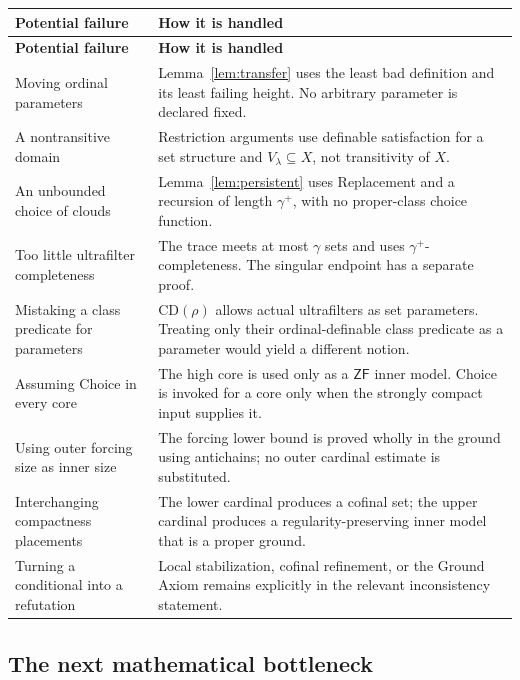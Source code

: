 \documentclass[11pt,letterpaper]{article}
\theoremstyle{definition}
\newcommand{\ZF}{\mathsf{ZF}}
\newcommand{\CD}{\mathrm{CD}}
\begin{document}
\begingroup\small
\renewcommand{\arraystretch}{1.16}
\begin{longtable}{@{}P{.30\textwidth}P{.64\textwidth}@{}}
\toprule
\textbf{Potential failure} & \textbf{How it is handled}\\
\midrule\endfirsthead
\toprule\textbf{Potential failure}&\textbf{How it is handled}\\\midrule\endhead
Moving ordinal parameters & Lemma~\ref{lem:transfer} uses the least bad definition and its least failing height. No arbitrary parameter is declared fixed.\\[4pt]
A nontransitive domain & Restriction arguments use definable satisfaction for a set structure and $V_\lambda\subseteq X$, not transitivity of $X$.\\[4pt]
An unbounded choice of clouds & Lemma~\ref{lem:persistent} uses Replacement and a recursion of length $\gamma^+$, with no proper-class choice function.\\[4pt]
Too little ultrafilter completeness & The trace meets at most $\gamma$ sets and uses $\gamma^+$-completeness. The singular endpoint has a separate proof.\\[4pt]
Mistaking a class predicate for parameters & $\CD(\rho)$ allows actual ultrafilters as set parameters. Treating only their ordinal-definable class predicate as a parameter would yield a different notion.\\[4pt]
Assuming Choice in every core & The high core is used only as a $\ZF$ inner model. Choice is invoked for a core only when the strongly compact input supplies it.\\[4pt]
Using outer forcing size as inner size & The forcing lower bound is proved wholly in the ground using antichains; no outer cardinal estimate is substituted.\\[4pt]
Interchanging compactness placements & The lower cardinal produces a cofinal set; the upper cardinal produces a regularity-preserving inner model that is a proper ground.\\[4pt]
Turning a conditional into a refutation & Local stabilization, cofinal refinement, or the Ground Axiom remains explicitly in the relevant inconsistency statement.\\
\bottomrule
\end{longtable}
\endgroup

\subsection{The next mathematical bottleneck}
\end{document}
